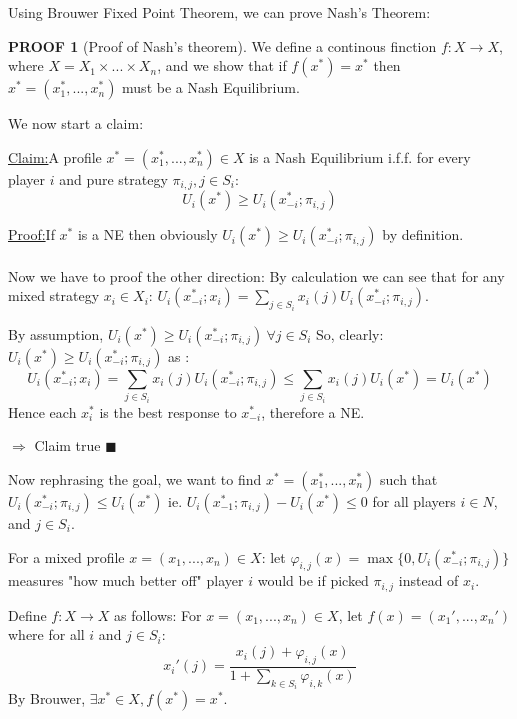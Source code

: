 \documentclass[12pt]{article}
\theoremstyle{definition}
\newtheorem*{Proof}{PROOF}
\newenvironment{claim}[1]{\par\noindent\underline{Claim:}\space#1}{}
\newenvironment{claimproof}[1]{\par\noindent\underline{Proof:}\space#1}{\hfill $\blacksquare$}
\begin{document}
    Using Brouwer Fixed Point Theorem, we can prove Nash's Theorem:
    
    \begin{Proof}[Proof of Nash's theorem]
        We define a continous finction $f: X \rightarrow X$, where $X = X_1 \times ... \times X_n$, and we show that if $f(x^*) = x^*$ then $x^* = (x_1^*,...,x_n^*)$ must be a Nash Equilibrium.
        
        We now start a claim:
        \begin{claim}
            A profile $x^*= (x_1^*,...,x_n^*) \in X$ is a Nash Equilibrium i.f.f. for every player $i$ and pure strategy $\pi_{i,j}, j \in S_i$: $$U_i(x^*) \geq U_i(x_{-i}^*;\pi_{i,j})$$
        \end{claim}
        \begin{claimproof}
            If $x^*$ is a NE then obviously $U_i(x^*) \geq U_i(x_{-i}^*;\pi_{i,j})$ by definition.\\
            \\Now we have to proof the other direction: By calculation we can see that for any mixed strategy $x_i \in X_i$:
            $U_i(x_{-i}^*;x_i) = \sum_{j \in S_i}x_i(j)U_i(x_{-i}^*;\pi_{i,j})$.
            
            By assumption, $U_i(x^*) \geq U_i(x_{-i}^*;\pi_{i,j}) \ \forall j \in S_i$ So, clearly: $U_i(x^*) \geq U_i(x_{-i}^*;\pi_{i,j})$ as :
            $$U_i(x_{-i}^*; x_i) = \sum_{j \in S_i}x_i(j)U_i(x_{-i}^*; \pi_{i,j}) \leq \sum_{j \in S_i}x_i(j)U_i(x^*) = U_i(x^*)$$
            Hence each $x_i^*$ is the best response to $x_{-i}^*$, therefore a NE.
            
            $\Rightarrow$ Claim true
        \end{claimproof}

        Now rephrasing the goal, we want to find $x^* = (x_1^*,...,x_n^*)$ such that $U_i(x_{-i}^*;\pi_{i,j}) \leq U_i(x^*)$ ie. $U_i(x_{-1}^*;\pi_{i,j}) - U_i(x^*) \leq 0$ for all players $i \in N$, and $j \in S_i$.
        
        For a mixed profile $x = (x_1,...,x_n) \in X$: let $\varphi_{i,j}(x) = \max\{0, U_i(x_{-i}^*;\pi_{i,j})\}$ measures "how much better off" player $i$ would be if picked $\pi_{i,j}$ instead of $x_i$.
        
        Define $f:X \rightarrow X$ as follows: For $x = (x_1,...,x_n) \in X$, let $f(x) = (x_1',...,x_n')$ where for all $i$ and $j \in S_i$: $$x_i'(j) = \frac{x_i(j) + \varphi_{i,j}(x)}{1 + \sum_{k \in S_i} \varphi_{i,k}(x)}$$
        By Brouwer, $\exists x^* \in X, f(x^*) = x^*$.


\end{Proof}
\end{document}
